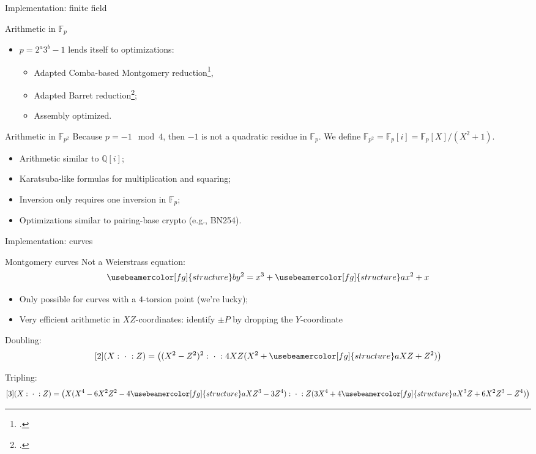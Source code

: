 \documentclass{beamer}
\renewcommand{\emph}[1]{{\usebeamercolor[fg]{structure}#1}}
\newcommand{\Q}{\mathbb{Q}}
\newcommand{\F}{\mathbb{F}}
\begin{document}

\begin{frame}{Implementation: finite field}
  \begin{block}{Arithmetic in $\F_p$}
    \begin{itemize}
    \item $p = 2^a3^b - 1$ lends itself to optimizations:
      \begin{itemize}
      \item Adapted Comba-based Montgomery reduction\footcite{costello2016sidh},
      \item Adapted Barret reduction\footcite{vercauteren-sidh-fp};
      \item Assembly optimized.
      \end{itemize}
    \end{itemize}
  \end{block}

  \begin{block}{Arithmetic in $\F_{p^2}$}
    Because $p = -1 \mod 4$, then $-1$ is not a quadratic residue in
    $\F_p$. We define \emph{$\F_{p^2} = \F_p[i] = \F_p[X]/(X^2+1)$}.
    \begin{itemize}
    \item Arithmetic similar to $\Q[i]$;
    \item Karatsuba-like formulas for multiplication and squaring;
    \item Inversion only requires one inversion in $\F_p$;
    \item Optimizations similar to pairing-base crypto (e.g., BN254).
    \end{itemize}
  \end{block}
\end{frame}


\begin{frame}{Implementation: curves}
  \begin{block}{Montgomery curves}
    Not a Weierstrass equation:
    \[\emph{b}y^2 = x^3 + \emph{a}x^2 + x\]
    \begin{itemize}
    \item Only possible for curves with a $4$-torsion point (we're
      lucky);
    \item Very efficient arithmetic in \emph{$XZ$-coordinates}:
      identify $\pm P$ by dropping the $Y$-coordinate
    \end{itemize}
  \end{block}

  Doubling:
  \[[2](X:\;\cdot\;:Z) = \bigl((X^2 - Z^2)^2:\;\cdot\;:4XZ(X^2+\emph{a}XZ+Z^2)\bigr)\]

  Tripling:
  \footnotesize
  \[[3](X:\;\cdot\;:Z) =
    \bigl(X(X^4-6X^2Z^2-4\emph{a}XZ^3-3Z^4):\;\cdot\;:Z(3X^4+4\emph{a}X^3Z+6X^2Z^3-Z^4)\bigr)\]
\end{frame}
\end{document}
